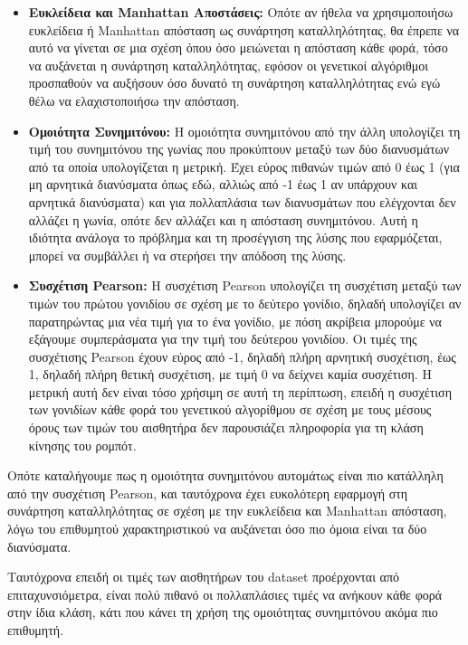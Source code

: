 \documentclass[12pt,a4paper]{article}
\begin{document}
\begin{itemize}
    \item \textbf{Ευκλείδεια και Manhattan Αποστάσεις:} Οπότε αν ήθελα να χρησιμοποιήσω ευκλείδεια ή Manhattan απόσταση ως συνάρτηση καταλληλότητας, θα έπρεπε να αυτό να γίνεται σε μια σχέση όπου όσο μειώνεται η απόσταση κάθε φορά, τόσο να αυξάνεται η συνάρτηση καταλληλότητας, εφόσον οι γενετικοί αλγόριθμοι προσπαθούν να αυξήσουν όσο δυνατό τη συνάρτηση καταλληλότητας ενώ εγώ θέλω να ελαχιστοποιήσω την απόσταση.

    \item \textbf{Ομοιότητα Συνημιτόνου:} Η ομοιότητα συνημιτόνου από την άλλη υπολογίζει τη τιμή του συνημιτόνου της γωνίας που προκύπτουν μεταξύ των δύο διανυσμάτων από τα οποία υπολογίζεται η μετρική. Έχει εύρος πιθανών τιμών από 0 έως 1 (για μη αρνητικά διανύσματα όπως εδώ, αλλιώς από -1 έως 1 αν υπάρχουν και αρνητικά διανύσματα) και για πολλαπλάσια των διανυσμάτων που ελέγχονται δεν αλλάζει η γωνία, οπότε δεν αλλάζει και η απόσταση συνημιτόνου. Αυτή η ιδιότητα ανάλογα το πρόβλημα και τη προσέγγιση της λύσης που εφαρμόζεται, μπορεί να συμβάλλει ή να στερήσει την απόδοση της λύσης.
        
    \item \textbf{Συσχέτιση Pearson:} Η συσχέτιση Pearson υπολογίζει τη συσχέτιση μεταξύ των τιμών του πρώτου γονιδίου σε σχέση με το δεύτερο γονίδιο, δηλαδή υπολογίζει αν παρατηρώντας μια νέα τιμή για το ένα γονίδιο, με πόση ακρίβεια μπορούμε να εξάγουμε συμπεράσματα για την τιμή του δεύτερου γονιδίου. Οι τιμές της συσχέτισης Pearson έχουν εύρος από -1, δηλαδή πλήρη αρνητική συσχέτιση, έως 1, δηλαδή πλήρη θετική συσχέτιση, με τιμή 0 να δείχνει καμία συσχέτιση. Η μετρική αυτή δεν είναι τόσο χρήσιμη σε αυτή τη περίπτωση, επειδή η συσχέτιση των γονιδίων κάθε φορά του γενετικού αλγορίθμου σε σχέση με τους μέσους όρους των τιμών του αισθητήρα δεν παρουσιάζει πληροφορία για τη κλάση κίνησης του ρομπότ.
\end{itemize}

Οπότε καταλήγουμε πως η ομοιότητα συνημιτόνου αυτομάτως είναι πιο κατάλληλη από την συσχέτιση Pearson, και ταυτόχρονα έχει ευκολότερη εφαρμογή στη συνάρτηση καταλληλότητας σε σχέση με την ευκλείδεια και Manhattan απόσταση, λόγω του επιθυμητού χαρακτηριστικού να αυξάνεται όσο πιο όμοια είναι τα δύο διανύσματα. 

Ταυτόχρονα επειδή οι τιμές των αισθητήρων του dataset προέρχονται από επιταχυνσιόμετρα, είναι πολύ πιθανό οι πολλαπλάσιες τιμές να ανήκουν κάθε φορά στην ίδια κλάση, κάτι που κάνει τη χρήση της ομοιότητας συνημιτόνου ακόμα πιο επιθυμητή.
\end{document}
